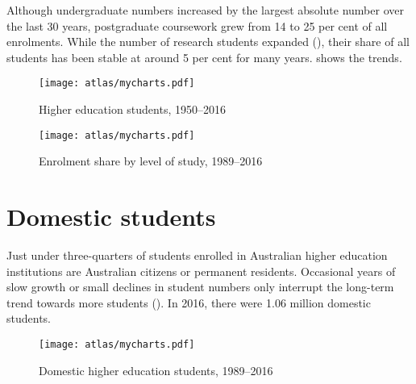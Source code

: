 \documentclass{grattan}
\begin{document}
Although undergraduate numbers increased by the largest absolute number over the last 30 years, postgraduate coursework grew from 14 to 25 per cent of all enrolments. While the number of research students expanded (), their share of all students has been stable at around 5 per cent for many years.  shows the trends.


    \begin{figure} %
    \caption{Higher education students, 1950--2016}\label{fig:higher-education-students-19502016}
    \texttt{[image: atlas/mycharts.pdf]}
    \end{figure}



    \begin{figure} %
    \caption{Enrolment share by level of study, 1989--2016}\label{fig:enrolment-share-by-level-of-study-19892016}
    \texttt{[image: atlas/mycharts.pdf]}
    \end{figure}



%
\section{Domestic students }\label{sec:domestic-students}

Just under three-quarters of students enrolled in Australian higher education institutions are Australian citizens or permanent residents. Occasional years of slow growth or small declines in student numbers only interrupt the long-term trend towards more students (). In 2016, there were 1.06 million domestic students.


    \begin{figure} %
    \caption{Domestic higher education students, 1989--2016}\label{fig:domestic-higher-education-students-19892016}
    \texttt{[image: atlas/mycharts.pdf]}
    \end{figure}
\end{document}
